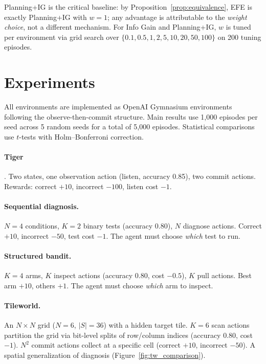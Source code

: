 \documentclass[runningheads]{llncs}
\begin{document}
Planning+IG is the critical baseline: by Proposition~\ref{prop:equivalence}, EFE is exactly Planning+IG with $w{=}1$; any advantage is attributable to the \emph{weight choice}, not a different mechanism. For Info Gain and Planning+IG, $w$ is tuned per environment via grid search over $\{0.1, 0.5, 1, 2, 5, 10, 20, 50, 100\}$ on 200 tuning episodes.

\section{Experiments}

All environments are implemented as OpenAI Gymnasium environments following the observe-then-commit structure. Main results use 1{,}000 episodes per seed across 5 random seeds for a total of 5{,}000 episodes. Statistical comparisons use $t$-tests with Holm--Bonferroni correction.

\paragraph{Tiger} \citep{kaelbling1998}. Two states, one observation action (listen, accuracy 0.85), two commit actions. Rewards: correct $+10$, incorrect $-100$, listen cost $-1$.

\paragraph{Sequential diagnosis.} $N{=}4$ conditions, $K{=}2$ binary tests (accuracy 0.80), $N$ diagnose actions. Correct $+10$, incorrect $-50$, test cost $-1$. The agent must choose \emph{which} test to run.

\paragraph{Structured bandit.} $K{=}4$ arms, $K$ inspect actions (accuracy 0.80, cost $-0.5$), $K$ pull actions. Best arm $+10$, others $+1$. The agent must choose \emph{which} arm to inspect.

\paragraph{Tileworld.} An $N{\times}N$ grid ($N{=}6$, $|S|{=}36$) with a hidden target tile. $K{=}6$ scan actions partition the grid via bit-level splits of row/column indices (accuracy $0.80$, cost $-1$). $N^2$ commit actions collect at a specific cell (correct $+10$, incorrect $-50$). A spatial generalization of diagnosis (Figure~\ref{fig:tw_comparison}).
\end{document}
